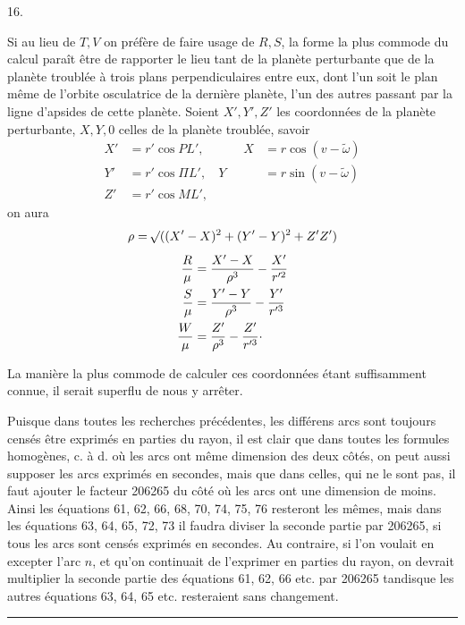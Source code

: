 \par{}\bigskip
{}
\begin{center}16.\end{center}
\noindent\hspace*{\parindent}Si au lieu de \(T,V\) on préfère de faire usage de \(R,S\), la forme la plus commode du calcul paraît être de rapporter le lieu tant de la planète perturbante que de la planète troublée à trois plans perpendiculaires entre eux, dont l’un soit le plan même de l’orbite osculatrice de la dernière planète, l’un des autres passant par la ligne d’apsides de cette planète. Soient \(X',Y',Z'\) les coordonnées de la planète perturbante, \(X,Y,0\) celles de la planète troublée, savoir
\[
\begin{aligned}
X'&=r'\cos PL',&\qquad X&=r\cos(v-\tilde\omega)\\
Y'&=r'\cos\Pi L',&Y&=r\sin(v-\tilde\omega)\\
Z'&=r'\cos ML',&&
\end{aligned}
\]
on aura
\[
\begin{gathered}
\rho=\mathord{{}^{}\!\surd}((X'-X)^2+(Y'-Y)^2+Z'Z')\\[4pt]
\begin{aligned}
\dfrac{R}{\mu}&=\dfrac{X'-X}{\rho^3}-\dfrac{X'}{r'^2}\\
\dfrac{S}{\mu}&=\dfrac{Y'-Y}{\rho^3}-\dfrac{Y'}{r'^3}\\
\dfrac{W}{\mu}&=\dfrac{Z'}{\rho^3}-\dfrac{Z'}{r'^3}\mathpunct{\cdot}
\end{aligned}
\end{gathered}
\]
\par La manière la plus commode de calculer ces coordonnées étant suffisamment connue, il serait superflu de nous y arrêter.
\par Puisque dans toutes les recherches précédentes, les différens arcs sont toujours censés être exprimés en parties du rayon, il est clair que dans toutes les formules homogènes, c. à d. où les arcs ont même dimension des deux côtés, on peut aussi supposer les arcs exprimés en secondes, mais que dans celles, qui ne le sont pas, il faut ajouter le facteur 206265 du côté où les arcs ont une dimension de moins. Ainsi les équations 61, 62, 66, 68, 70, 74, 75, 76 resteront les mêmes, mais dans les équations 63, 64, 65, 72, 73 il faudra diviser la seconde partie par 206265, si tous les arcs sont censés exprimés en secondes. Au contraire, si l’on voulait en excepter l’arc \(n\), et qu’on continuait de l’exprimer en parties du rayon, on devrait multiplier la seconde partie des équations 61, 62, 66 etc. par 206265 tandisque les autres équations 63, 64, 65 etc. resteraient sans changement.
\par\medskip\begin{center}\rule{4em}{.4pt}\end{center}
